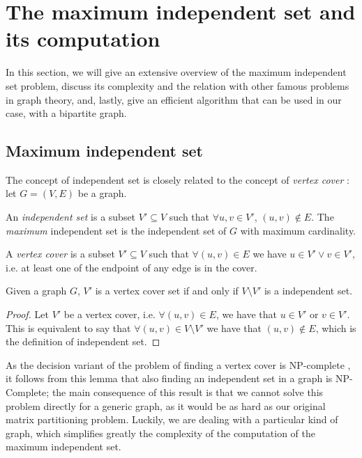 \section{The maximum independent set and its computation} \label{sec:is_com}

In this section, we will give an extensive overview of the maximum independent set problem, discuss its complexity and the relation with other famous problems in graph theory, and, lastly, give an efficient algorithm that can be used in our case, with a bipartite graph.

\subsection{Maximum independent set}

The concept of independent set is closely related to the concept of \emph{vertex cover} \cite{np_book}: let $G=(V,E)$ be a graph.

\begin{definition}
An \emph{independent set} is a subset $V' \subseteq V$ such that $ \forall u,v \in V'$, $(u,v) \notin E$.
The \emph{maximum} independent set is the independent set of $G$ with maximum cardinality.
\end{definition}

\begin{definition}
A \emph{vertex cover} is a subset $V' \subseteq V$ such that $\forall (u,v) \in E$ we have $u \in V' \vee v \in V'$, i.e. at least one of the endpoint of any edge is in the cover.
\end{definition}

\begin{lemma} 
 \label{lemma:is}
 Given a graph $G$, $V'$ is a vertex cover set if and only if $V \setminus V'$ is a independent set.
 \end{lemma}
 \begin{proof}
	 Let $V'$ be a vertex cover, i.e. $\forall (u,v) \in E$, we have that $u \in V'$ or $v \in V'$. This is equivalent to say that $\forall (u,v) \in V \setminus V'$ we have that $(u,v) \notin E$, which is the definition of independent set.
 \end{proof}
As the decision variant of the problem of finding a vertex cover is NP-complete \cite[Theorem 3.3]{np_book}, it follows from this lemma that also finding an independent set in a graph is NP-Complete; the main consequence of this result is that we cannot solve this problem directly for a generic graph, as it would be as hard as our original matrix partitioning problem. Luckily, we are dealing with a particular kind of graph, which simplifies greatly the complexity of the computation of the maximum independent set.

